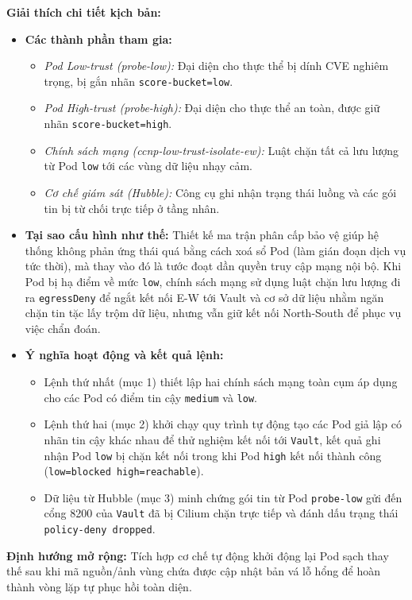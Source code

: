 \textbf{Giải thích chi tiết kịch bản:}
\begin{itemize}[itemsep=4pt, parsep=0pt]
    \item \textbf{Các thành phần tham gia:}
    \begin{itemize}
        \item \textit{Pod Low-trust (probe-low):} Đại diện cho thực thể bị dính CVE nghiêm trọng, bị gắn nhãn \texttt{score-bucket=low}.
        \item \textit{Pod High-trust (probe-high):} Đại diện cho thực thể an toàn, được giữ nhãn \texttt{score-bucket=high}.
        \item \textit{Chính sách mạng (ccnp-low-trust-isolate-ew):} Luật chặn tất cả lưu lượng từ Pod \texttt{low} tới các vùng dữ liệu nhạy cảm.
        \item \textit{Cơ chế giám sát (Hubble):} Công cụ ghi nhận trạng thái luồng và các gói tin bị từ chối trực tiếp ở tầng nhân.
    \end{itemize}
    \item \textbf{Tại sao cấu hình như thế:} Thiết kế ma trận phân cấp bảo vệ giúp hệ thống không phản ứng thái quá bằng cách xoá sổ Pod (làm gián đoạn dịch vụ tức thời), mà thay vào đó là tước đoạt dần quyền truy cập mạng nội bộ. Khi Pod bị hạ điểm về mức \texttt{low}, chính sách mạng sử dụng luật chặn lưu lượng đi ra \texttt{egressDeny} để ngắt kết nối E-W tới Vault và cơ sở dữ liệu nhằm ngăn chặn tin tặc lấy trộm dữ liệu, nhưng vẫn giữ kết nối North-South để phục vụ việc chẩn đoán.
    \item \textbf{Ý nghĩa hoạt động và kết quả lệnh:} 
    \begin{itemize}
        \item Lệnh thứ nhất (mục 1) thiết lập hai chính sách mạng toàn cụm áp dụng cho các Pod có điểm tin cậy \texttt{medium} và \texttt{low}.
        \item Lệnh thứ hai (mục 2) khởi chạy quy trình tự động tạo các Pod giả lập có nhãn tin cậy khác nhau để thử nghiệm kết nối tới \texttt{Vault}, kết quả ghi nhận Pod \texttt{low} bị chặn kết nối trong khi Pod \texttt{high} kết nối thành công (\texttt{low=blocked high=reachable}).
        \item Dữ liệu từ Hubble (mục 3) minh chứng gói tin từ Pod \texttt{probe-low} gửi đến cổng 8200 của \texttt{Vault} đã bị Cilium chặn trực tiếp và đánh dấu trạng thái \texttt{policy-deny dropped}.
    \end{itemize}
\end{itemize}

\textbf{Định hướng mở rộng:} Tích hợp cơ chế tự động khởi động lại Pod sạch thay thế sau khi mã nguồn/ảnh vùng chứa được cập nhật bản vá lỗ hổng để hoàn thành vòng lặp tự phục hồi toàn diện.

